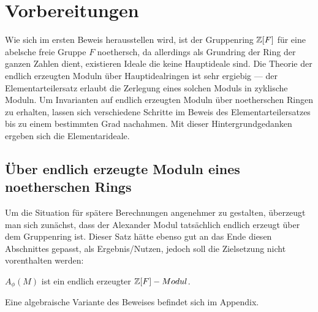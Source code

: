 
\section{Vorbereitungen}


Wie sich im ersten Beweis herausstellen wird, ist der Gruppenring $\mathbb{Z}[F]$ für eine abelsche freie Gruppe $F$ noethersch, da allerdings als Grundring der Ring der ganzen Zahlen dient, existieren Ideale die keine Hauptideale sind. Die Theorie der endlich erzeugten Moduln über Hauptidealringen ist sehr ergiebig --- der Elementarteilersatz erlaubt die Zerlegung eines solchen Moduls in zyklische Moduln. Um Invarianten auf endlich erzeugten Moduln über noetherschen Ringen zu erhalten, lassen sich verschiedene Schritte im Beweis des Elementarteilersatzes bis zu einem bestimmten Grad nachahmen. Mit dieser Hintergrundgedanken ergeben sich die Elementarideale. 

\subsection{Über endlich erzeugte Moduln eines noetherschen Rings}



Um die Situation für spätere Berechnungen angenehmer zu gestalten, überzeugt man sich zunächst, dass der Alexander Modul tatsächlich endlich erzeugt über dem Gruppenring ist. Dieser Satz hätte ebenso gut an das Ende diesen Abschnittes gepasst, als Ergebnis/Nutzen, jedoch soll die Zielsetzung nicht vorenthalten werden: 
\begin{prop}
		$A_\phi(M)$ ist ein endlich erzeugter $\mathbb{Z}[F]-Modul$.
\end{prop}
\begin{bem}\label{rem:AlexModulendlerz}
	Eine algebraische Variante des Beweises befindet sich im Appendix. 
\end{bem}


